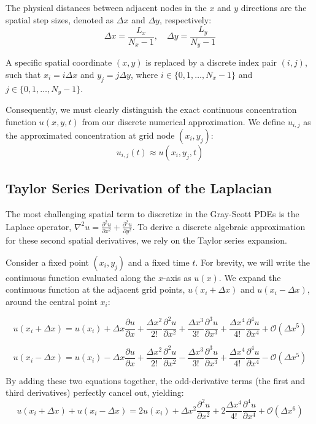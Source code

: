 \documentclass[12pt,a4paper]{article}
\begin{document}
The physical distances between adjacent nodes in the $x$ and $y$ directions are the spatial step sizes, denoted as $\Delta x$ and $\Delta y$, respectively:
$$\Delta x = \frac{L_x}{N_x - 1}, \quad \Delta y = \frac{L_y}{N_y - 1}$$

A specific spatial coordinate $(x, y)$ is replaced by a discrete index pair $(i, j)$, such that $x_i = i \Delta x$ and $y_j = j \Delta y$, where $i \in \{0, 1, \dots, N_x-1\}$ and $j \in \{0, 1, \dots, N_y-1\}$.

Consequently, we must clearly distinguish the exact continuous concentration function $u(x, y, t)$ from our discrete numerical approximation. We define $u_{i,j}$ as the approximated concentration at grid node $(x_i, y_j)$:
$$u_{i,j}(t) \approx u(x_i, y_j, t)$$

\subsection{Taylor Series Derivation of the Laplacian}
The most challenging spatial term to discretize in the Gray-Scott PDEs is the Laplace operator, $\nabla^2 u = \frac{\partial^2 u}{\partial x^2} + \frac{\partial^2 u}{\partial y^2}$. To derive a discrete algebraic approximation for these second spatial derivatives, we rely on the Taylor series expansion.

Consider a fixed point $(x_i, y_j)$ and a fixed time $t$. For brevity, we will write the continuous function evaluated along the $x$-axis as $u(x)$. We expand the continuous function at the adjacent grid points, $u(x_i + \Delta x)$ and $u(x_i - \Delta x)$, around the central point $x_i$:

$$u(x_i + \Delta x) = u(x_i) + \Delta x \frac{\partial u}{\partial x} + \frac{\Delta x^2}{2!} \frac{\partial^2 u}{\partial x^2} + \frac{\Delta x^3}{3!} \frac{\partial^3 u}{\partial x^3} + \frac{\Delta x^4}{4!} \frac{\partial^4 u}{\partial x^4} + \mathcal{O}(\Delta x^5)$$

$$u(x_i - \Delta x) = u(x_i) - \Delta x \frac{\partial u}{\partial x} + \frac{\Delta x^2}{2!} \frac{\partial^2 u}{\partial x^2} - \frac{\Delta x^3}{3!} \frac{\partial^3 u}{\partial x^3} + \frac{\Delta x^4}{4!} \frac{\partial^4 u}{\partial x^4} - \mathcal{O}(\Delta x^5)$$

By adding these two equations together, the odd-derivative terms (the first and third derivatives) perfectly cancel out, yielding:
$$u(x_i + \Delta x) + u(x_i - \Delta x) = 2u(x_i) + \Delta x^2 \frac{\partial^2 u}{\partial x^2} + 2\frac{\Delta x^4}{4!} \frac{\partial^4 u}{\partial x^4} + \mathcal{O}(\Delta x^6)$$
\end{document}
